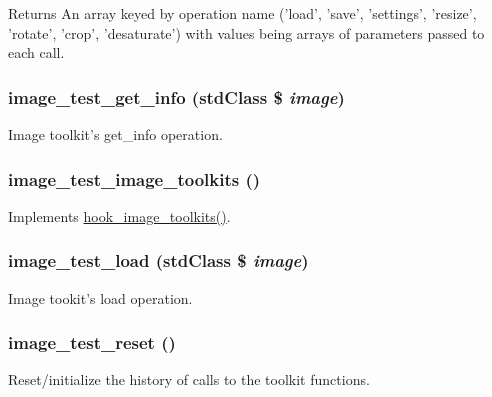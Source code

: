 \begin{DoxyReturn}{Returns}
An array keyed by operation name ('load', 'save', 'settings', 'resize', 'rotate', 'crop', 'desaturate') with values being arrays of parameters passed to each call. 
\end{DoxyReturn}
\hypertarget{image__test_8module_abd63bedf9d7d28fce9c3fd677e54a7b0}{
\subsubsection[{image\_\-test\_\-get\_\-info}]{\setlength{\rightskip}{0pt plus 5cm}image\_\-test\_\-get\_\-info (stdClass \$ {\em image})}}
\label{image__test_8module_abd63bedf9d7d28fce9c3fd677e54a7b0}
Image toolkit's get\_\-info operation. \hypertarget{image__test_8module_a5e12de459d4da7789a210060e584e9d6}{
\subsubsection[{image\_\-test\_\-image\_\-toolkits}]{\setlength{\rightskip}{0pt plus 5cm}image\_\-test\_\-image\_\-toolkits ()}}
\label{image__test_8module_a5e12de459d4da7789a210060e584e9d6}
Implements \hyperlink{group__hooks_ga9abe202036afcc6a3cc97ccc2c13ab29}{hook\_\-image\_\-toolkits()}. \hypertarget{image__test_8module_a1bedb17b61df956adac6c295378ca8cc}{
\subsubsection[{image\_\-test\_\-load}]{\setlength{\rightskip}{0pt plus 5cm}image\_\-test\_\-load (stdClass \$ {\em image})}}
\label{image__test_8module_a1bedb17b61df956adac6c295378ca8cc}
Image tookit's load operation. \hypertarget{image__test_8module_a30ba1bb2238f38e31212ca0544a0a88c}{
\subsubsection[{image\_\-test\_\-reset}]{\setlength{\rightskip}{0pt plus 5cm}image\_\-test\_\-reset ()}}
\label{image__test_8module_a30ba1bb2238f38e31212ca0544a0a88c}
Reset/initialize the history of calls to the toolkit functions.

